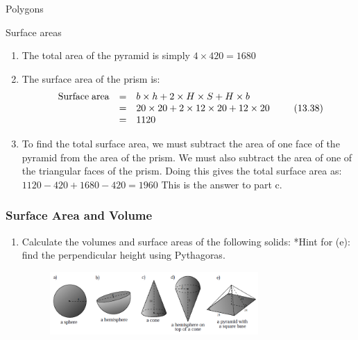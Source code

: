 \begin{exercises}{Polygons}
\begin{exercises}{Surface areas }
{\begin{mdframed}[linewidth=4, leftmargin=40, rightmargin=40]
\begin{exercise}
\begin{enumerate}[noitemsep, label=\textbf{Step} \textbf{\arabic*}. ]
This is the answer to part b.
\item The total area of the pyramid is simply $4\ensuremath{\times}420=1680$\item The surface area of the prism is:
\label{m39357*id69663}\nopagebreak\noindent{}
    \begin{equation}
    \begin{array}{ccc}\mathrm{Surface\; area}& =& b\ensuremath{\times}h+2\ensuremath{\times}H\ensuremath{\times}S+H\ensuremath{\times}b\hfill \\ & =& \mathrm{20}\ensuremath{\times}\mathrm{20}+2\ensuremath{\times}\mathrm{12}\ensuremath{\times}\mathrm{20}+\mathrm{12}\ensuremath{\times}\mathrm{20}\hfill \\ & =& 1120\hfill \end{array}\tag{13.38}
      \end{equation}
    

\item To find the total surface area, we must subtract the area of one face of the pyramid from the area of the prism. We must also subtract the area of one of the triangular faces of the prism. Doing this gives the total surface area as:
$1120-420+1680-420=1960$ This is the answer to part c.\end{enumerate}
        


    \end{exercise}
    \end{mdframed}
    }
    \noindent
  \label{m39357*secfhsst!!!underscore!!!id508}
            \subsubsection{  Surface Area and Volume }
            \nopagebreak
            
      \label{m39357*id63805}\begin{enumerate}[noitemsep, label=\textbf{\arabic*}. ] 
            \label{m39357*uid7654}\item Calculate the volumes and surface areas of the following solids: *Hint for (e): find the perpendicular height using Pythagoras.

    \setcounter{subfigure}{0}


	\begin{figure}[H] %
    \begin{center}
    \label{m39357*id63823!!!underscore!!!media}\label{m39357*id63823!!!underscore!!!printimage}\includegraphics[width=300px]{col11306.imgs/m39357_MG11C16_005.png} %
        

\end{center}
\end{figure}
\end{enumerate}
\end{exercises}
\end{exercises}
